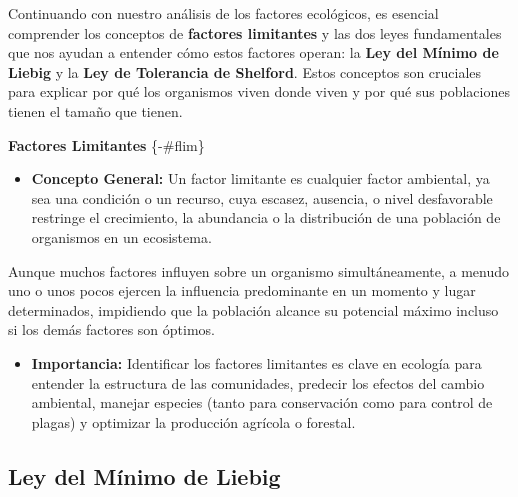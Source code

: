 \documentclass[
]{book}
\providecommand{\tightlist}{%
  \setlength{\itemsep}{0pt}\setlength{\parskip}{0pt}}
\begin{document}
Continuando con nuestro análisis de los factores ecológicos, es esencial comprender los conceptos de \textbf{factores limitantes} y las dos leyes fundamentales que nos ayudan a entender cómo estos factores operan: la \textbf{Ley del Mínimo de Liebig} y la \textbf{Ley de Tolerancia de Shelford}. Estos conceptos son cruciales para explicar por qué los organismos viven donde viven y por qué sus poblaciones tienen el tamaño que tienen.

\textbf{Factores Limitantes} \{-\#flim\}

\begin{itemize}
\tightlist
\item
  \textbf{Concepto General:} Un factor limitante es cualquier factor ambiental, ya sea una condición o un recurso, cuya escasez, ausencia, o nivel desfavorable restringe el crecimiento, la abundancia o la distribución de una población de organismos en un ecosistema.
\end{itemize}

Aunque muchos factores influyen sobre un organismo simultáneamente, a menudo uno o unos pocos ejercen la influencia predominante en un momento y lugar determinados, impidiendo que la población alcance su potencial máximo incluso si los demás factores son óptimos.

\begin{itemize}
\tightlist
\item
  \textbf{Importancia:} Identificar los factores limitantes es clave en ecología para entender la estructura de las comunidades, predecir los efectos del cambio ambiental, manejar especies (tanto para conservación como para control de plagas) y optimizar la producción agrícola o forestal.
\end{itemize}

\subsection*{\texorpdfstring{\textbf{Ley del Mínimo de Liebig}}{Ley del Mínimo de Liebig}}\label{liebig}
\end{document}
